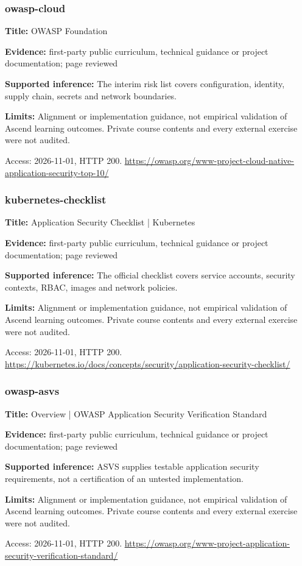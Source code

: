 \subsubsection{owasp-cloud}
\noindent\textbf{Title:} OWASP Foundation\par
\noindent\textbf{Evidence:} first-party public curriculum, technical guidance or project documentation; page reviewed\par
\noindent\textbf{Supported inference:} The interim risk list covers configuration, identity, supply chain, secrets and network boundaries.\par
\noindent\textbf{Limits:} Alignment or implementation guidance, not empirical validation of Ascend learning outcomes. Private course contents and every external exercise were not audited.\par
\noindent Access: 2026-11-01, HTTP 200. \url{https://owasp.org/www-project-cloud-native-application-security-top-10/}
\subsubsection{kubernetes-checklist}
\noindent\textbf{Title:} Application Security Checklist | Kubernetes\par
\noindent\textbf{Evidence:} first-party public curriculum, technical guidance or project documentation; page reviewed\par
\noindent\textbf{Supported inference:} The official checklist covers service accounts, security contexts, RBAC, images and network policies.\par
\noindent\textbf{Limits:} Alignment or implementation guidance, not empirical validation of Ascend learning outcomes. Private course contents and every external exercise were not audited.\par
\noindent Access: 2026-11-01, HTTP 200. \url{https://kubernetes.io/docs/concepts/security/application-security-checklist/}
\subsubsection{owasp-asvs}
\noindent\textbf{Title:} Overview | OWASP Application Security Verification Standard\par
\noindent\textbf{Evidence:} first-party public curriculum, technical guidance or project documentation; page reviewed\par
\noindent\textbf{Supported inference:} ASVS supplies testable application security requirements, not a certification of an untested implementation.\par
\noindent\textbf{Limits:} Alignment or implementation guidance, not empirical validation of Ascend learning outcomes. Private course contents and every external exercise were not audited.\par
\noindent Access: 2026-11-01, HTTP 200. \url{https://owasp.org/www-project-application-security-verification-standard/}
